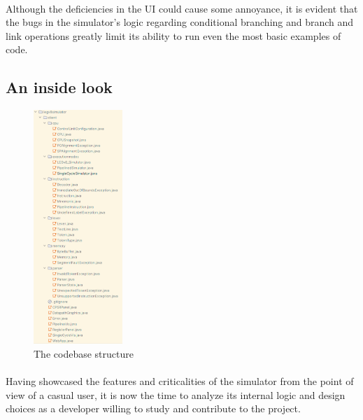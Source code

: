 \paragraph{}
Although the deficiencies in the UI could cause some annoyance, it is evident that the bugs in the simulator's logic regarding conditional branching and branch and link operations greatly limit its ability to run even the most basic examples of code.

\subsection{An inside look}\label{chap:chap1insidelook}
\begin{figure}
	\centering
	\includegraphics[width=0.30\textwidth]{img/classes.png}
	\caption{The codebase structure}
        \label{fig:codebase}
\end{figure}
\paragraph{}
Having showcased the features and criticalities of the simulator from the point of view of a casual user, it is now the time to analyze its internal logic and design choices as a developer willing to study and contribute to the project.
